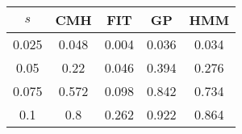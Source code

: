 \centering \begin{tabular}{c|c|c|c|c}
$s$	&CMH	&FIT	&GP	&HMM\\\hline
0.025	&0.048	&0.004	&0.036	&0.034\\
0.05	&0.22	&0.046	&0.394	&0.276\\
0.075	&0.572	&0.098	&0.842	&0.734\\
0.1	&0.8	&0.262	&0.922	&0.864\\
\end{tabular}
